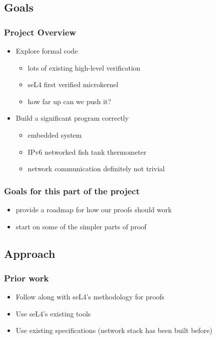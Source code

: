 \documentclass{beamer}
\begin{document}
\subsection{Goals}
\begin{frame}
    \frametitle{Project Overview}
    \begin{itemize}
        \item Explore formal code
            \begin{itemize}
                \item lots of existing high-level verification
                \item seL4 first verified microkernel
                \item how far up can we push it?
            \end{itemize}
        \item Build a significant program correctly
            \begin{itemize}
                \item embedded system
                \item IPv6 networked fish tank thermometer
                \item network communication definitely not trivial
            \end{itemize}
    \end{itemize}
\end{frame}

\begin{frame}
    \frametitle{Goals for this part of the project}
        \begin{itemize}
            \item provide a roadmap for how our proofs should work
            \item start on some of the simpler parts of proof
        \end{itemize}
\end{frame}


\subsection{Approach}
\begin{frame}
    \frametitle{Prior work}
    \begin{itemize}
        \item Follow along with seL4's methodology for proofs
        \item Use seL4's existing tools
        \item Use existing specifications (network stack has been built before)
    \end{itemize}
\end{frame}
\end{document}
